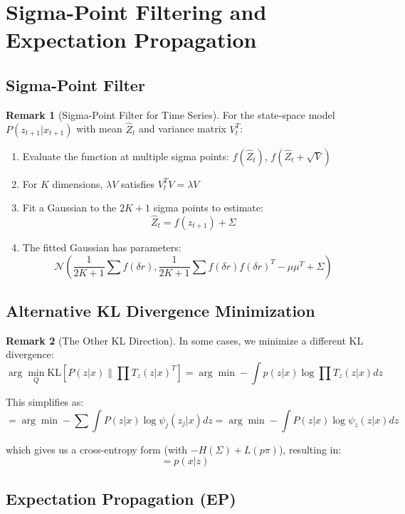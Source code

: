 \documentclass[12pt,a4paper]{article}
\theoremstyle{definition}
\newtheorem{remark}{Remark}[section]
\begin{document}
\newpage

\section{Sigma-Point Filtering and Expectation Propagation}

\subsection{Sigma-Point Filter}

\begin{remark}[Sigma-Point Filter for Time Series]
For the state-space model $P(z_{t+1} | x_{t+1})$ with mean $\hat{Z}_t$ and variance matrix $V_t^T$:

\begin{enumerate}
    \item Evaluate the function at multiple sigma points: $f(\hat{Z}_t)$, $f(\hat{Z}_t + \sqrt{V})$
    \item For $K$ dimensions, $\lambda V$ satisfies $V_t^T V = \lambda V$
    \item Fit a Gaussian to the $2K+1$ sigma points to estimate:
    \[
    \hat{Z}_t = f(z_{t+1}) + \Sigma
    \]
    
    \item The fitted Gaussian has parameters:
    \[
    \mathcal{N}\left( \frac{1}{2K+1} \sum f(\delta r), \frac{1}{2K+1} \sum f(\delta r) f(\delta r)^T - \mu \mu^T + \Sigma \right)
    \]
\end{enumerate}
\end{remark}

\subsection{Alternative KL Divergence Minimization}

\begin{remark}[The Other KL Direction]
In some cases, we minimize a different KL divergence:
\[
\arg\min_{Q} \text{KL}[P(z|x) \| \prod T_z(z|x)^T] = \arg\min -\int p(z|x) \log \prod T_z(z|x) dz
\]

This simplifies as:
\[
= \arg\min - \sum \int P(z|x) \log \psi_j(z_j|x) dz = \arg\min - \int P(z|x) \log \psi_z(z|x) dz
\]

which gives us a cross-entropy form (with $-H(\Sigma) + L(p\pi)$), resulting in:
\[
= p(x|z)
\]
\end{remark}

\subsection{Expectation Propagation (EP)}
\end{document}
